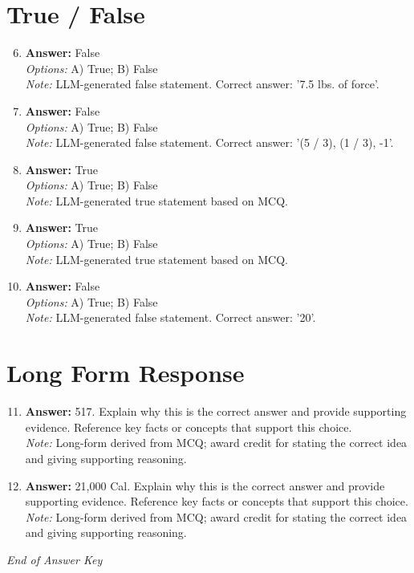 \documentclass[12pt]{article}
\begin{document}
\section*{True / False}
\begin{enumerate}[label=\arabic*.]
\setcounter{enumi}{5}
\item \textbf{Answer:} False
\\ \textit{Options:} A) True; B) False
\\ \textit{Note:} LLM-generated false statement. Correct answer: '7.5 lbs. of force'.
\item \textbf{Answer:} False
\\ \textit{Options:} A) True; B) False
\\ \textit{Note:} LLM-generated false statement. Correct answer: '(5 / 3), (1 / 3), -1'.
\item \textbf{Answer:} True
\\ \textit{Options:} A) True; B) False
\\ \textit{Note:} LLM-generated true statement based on MCQ.
\item \textbf{Answer:} True
\\ \textit{Options:} A) True; B) False
\\ \textit{Note:} LLM-generated true statement based on MCQ.
\item \textbf{Answer:} False
\\ \textit{Options:} A) True; B) False
\\ \textit{Note:} LLM-generated false statement. Correct answer: '20'.
\end{enumerate}

\section*{Long Form Response}
\begin{enumerate}[label=\arabic*.]
\setcounter{enumi}{10}
\item \textbf{Answer:} 517. Explain why this is the correct answer and provide supporting evidence. Reference key facts or concepts that support this choice.
\\ \textit{Note:} Long-form derived from MCQ; award credit for stating the correct idea and giving supporting reasoning.
\item \textbf{Answer:} 21,000 Cal. Explain why this is the correct answer and provide supporting evidence. Reference key facts or concepts that support this choice.
\\ \textit{Note:} Long-form derived from MCQ; award credit for stating the correct idea and giving supporting reasoning.
\end{enumerate}

\vfill
\noindent\textit{End of Answer Key}
\end{document}
